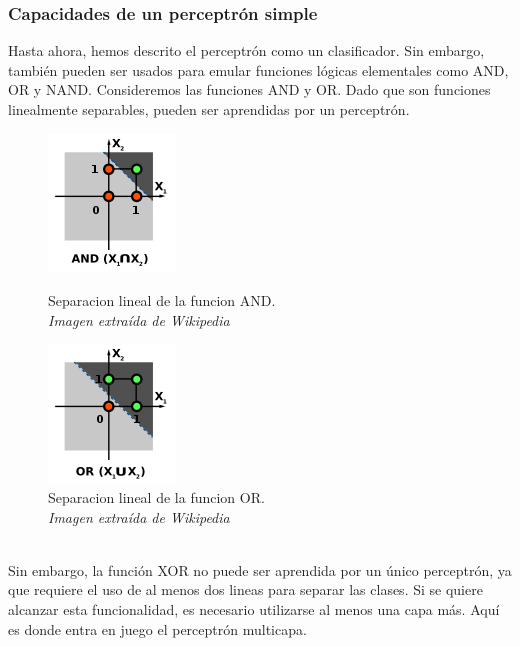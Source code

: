 \subsubsection{Capacidades de un perceptrón simple}
Hasta ahora, hemos descrito el perceptrón como un clasificador. Sin embargo, también pueden ser usados para emular funciones lógicas elementales como AND, OR y NAND. Consideremos las funciones AND y OR. Dado que son funciones linealmente separables, pueden ser aprendidas por un perceptrón.
\begin{figure}[htp]
\centering
\begin{minipage}[b]{0.4\textwidth}
    \includegraphics[scale=1]{images/perceptron_and.png}
    \caption{Separacion lineal de la funcion AND.\\\textit{Imagen extraída de Wikipedia}}
  \end{minipage}
\hfill
\begin{minipage}[b]{0.4\textwidth}
    \includegraphics[scale=1]{images/perceptron_or.png}
  \caption{Separacion lineal de la funcion OR.\\\textit{Imagen extraída de Wikipedia}}
  \end{minipage}
\end{figure}
\\Sin embargo, la función XOR no puede ser aprendida por un único perceptrón, ya que requiere el uso de al menos dos lineas para separar las clases. Si se quiere alcanzar esta funcionalidad, es necesario utilizarse al menos una capa más. Aquí es donde entra en juego el perceptrón multicapa.

